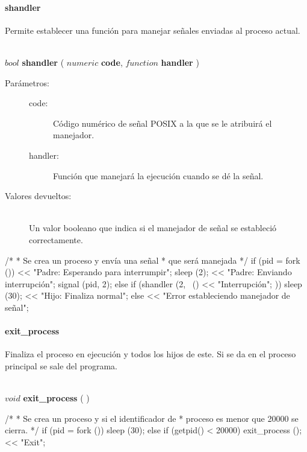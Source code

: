 \paragraph{shandler}
Permite establecer una función para manejar señales enviadas al proceso actual. 

\begin{framed}
\hfill \\ $bool$ \textbf{shandler} ( $numeric$ \textbf{code}, $function$ \textbf{handler} )  
\begin{description}
\item [Parámetros:] \hfill 
   \begin{description}
   \item[code:] Código numérico de señal POSIX a la que se le atribuirá el manejador.
   \item[handler:] Función que manejará la ejecución cuando se dé la señal.
   \end{description}
\item[Valores devueltos:] \hfill \\
   Un valor booleano que indica si el manejador de señal se estableció correctamente. 
\end{description}
\end{framed}
     
\begin{myverbatim}  
   /*
    * Se crea un proceso y envía una señal 
    * que será manejada
    */
   if (pid = fork ()) {
      << "Padre: Esperando para interrumpir";
      sleep (2);
      << "Padre: Enviando interrupción";
      signal (pid, 2);
   } else {
      if (shandler (2, ~(){ << "Interrupción"; })){
         sleep (30);
         << "Hijo: Finaliza normal";
      }else {
         << "Error estableciendo manejador de señal";
      }
   }
\end{myverbatim}

\paragraph{exit\_process}
Finaliza el proceso en ejecución y todos los hijos de este. Si se da en el
proceso principal se sale del programa.

\begin{framed}
\hfill \\ $void$ \textbf{exit\_process} ( )  
\end{framed}
     
\begin{myverbatim}  
   /*
    * Se crea un proceso y si el identificador de
    * proceso es menor que 20000 se cierra.
    */
   if (pid = fork ()) {
      sleep (30);
   } else {
      if (getpid() < 20000){
         exit_process ();
      }
      << "Exit";
   }
\end{myverbatim}

